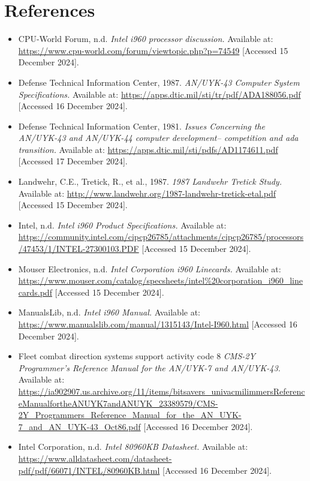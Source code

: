 \documentclass{article}
\begin{document}
\section{References}
\begin{itemize}
\item CPU-World Forum, n.d. \textit{Intel i960 processor discussion.} Available at: \url{https://www.cpu-world.com/forum/viewtopic.php?p=74549} [Accessed 15 December 2024].
\item Defense Technical Information Center, 1987. \textit{AN/UYK-43 Computer System Specifications.} Available at: \url{https://apps.dtic.mil/sti/tr/pdf/ADA188056.pdf} [Accessed 16 December 2024].
\item Defense Technical Information Center, 1981. \textit{Issues Concerning the AN/UYK-43 and AN/UYK-44 computer development--
competition and ada transition.} Available at: \url{https://apps.dtic.mil/sti/pdfs/AD1174611.pdf} [Accessed 17 December 2024].
\item Landwehr, C.E., Tretick, R., et al., 1987. \textit{1987 Landwehr Tretick Study.} Available at: \url{http://www.landwehr.org/1987-landwehr-tretick-etal.pdf} [Accessed 15 December 2024].

\item Intel, n.d. \textit{Intel i960 Product Specifications.} Available at: \url{https://community.intel.com/cipcp26785/attachments/cipcp26785/processors/47453/1/INTEL-27300103.PDF} [Accessed 15 December 2024].

\item Mouser Electronics, n.d. \textit{Intel Corporation i960 Linecards.} Available at: \url{https://www.mouser.com/catalog/specsheets/intel%20corporation_i960_linecards.pdf} [Accessed 15 December 2024].

\item ManualsLib, n.d. \textit{Intel i960 Manual.} Available at: \url{https://www.manualslib.com/manual/1315143/Intel-I960.html} [Accessed 16 December 2024].

\item Fleet combat direction systems support activity code 8 \textit{CMS-2Y Programmer's Reference Manual for the AN/UYK-7 and AN/UYK-43.} Available at: \url{https://ia902907.us.archive.org/11/items/bitsavers_univacmilimmersReferenceManualfortheANUYK7andANUYK_23389579/CMS-2Y_Programmers_Reference_Manual_for_the_AN_UYK-7_and_AN_UYK-43_Oct86.pdf} [Accessed 16 December 2024].

\item Intel Corporation, n.d. \textit{Intel 80960KB Datasheet.} Available at: \url{https://www.alldatasheet.com/datasheet-pdf/pdf/66071/INTEL/80960KB.html} [Accessed 16 December 2024].



\end{itemize}
\end{document}

